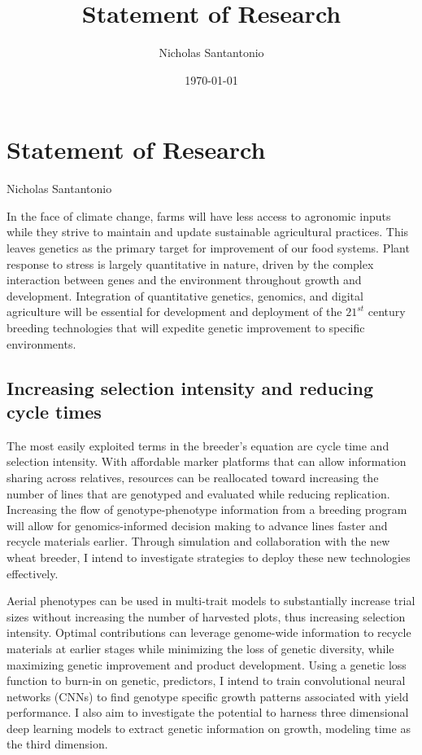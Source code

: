 \documentclass[11pt]{article}
\title{Statement of Research}
\author{Nicholas Santantonio}
\date{\today}
\begin{document}
\section*{\centering Statement of Research}
\begin{center} Nicholas Santantonio \end{center}

\noindent In the face of climate change, farms will have less access to agronomic inputs while they strive to maintain and update sustainable agricultural practices. This leaves genetics as the primary target for improvement of our food systems. Plant response to stress is largely quantitative in nature, driven by the complex interaction between genes and the environment throughout growth and development. Integration of quantitative genetics, genomics, and digital agriculture will be essential for development and deployment of the $21^{st}$ century breeding technologies that will expedite genetic improvement to specific environments.

\subsection*{Increasing selection intensity and reducing cycle times}

The most easily exploited terms in the breeder's equation are cycle time and selection intensity. With affordable marker platforms that can allow information sharing across relatives, resources can be reallocated toward increasing the number of lines that are genotyped and evaluated while reducing replication. Increasing the flow of genotype-phenotype information from a breeding program will allow for genomics-informed decision making to advance lines faster and recycle materials earlier. Through simulation and collaboration with the new wheat breeder, I intend to investigate strategies to deploy these new technologies effectively.%

Aerial phenotypes can be used in multi-trait models to substantially increase trial sizes without increasing the number of harvested plots, thus increasing selection intensity. Optimal contributions can leverage genome-wide information to recycle materials at earlier stages while minimizing the loss of genetic diversity, while  maximizing genetic improvement and product development. Using a genetic loss function to burn-in on genetic, predictors, I intend to train convolutional neural networks (CNNs) to find genotype specific growth patterns associated with yield performance. I also aim to investigate the potential to harness three dimensional deep learning models to extract genetic information on growth, modeling time as the third dimension.
\end{document}
